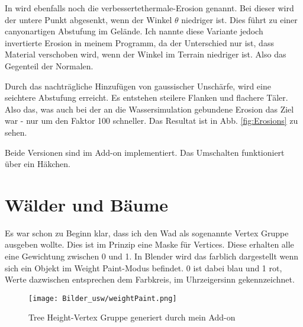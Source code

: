 \documentclass[12pt,twoside]{book}
\begin{document}
In \cite{erosion} wird ebenfalls noch die \glqq verbesserte\grqq{ }thermale-Erosion genannt. Bei dieser wird der untere Punkt abgesenkt, wenn der Winkel  \( \theta\) niedriger ist.
Dies f\"uhrt zu einer canyonartigen Abstufung im Gel\"ande. Ich nannte diese Variante jedoch invertierte Erosion in meinem Programm, da der Unterschied nur ist, dass Material verschoben wird, wenn der Winkel im Terrain niedriger ist. Also das Gegenteil der Normalen.

Durch das nachtr\"agliche Hinzuf\"ugen von gaussischer Unsch\"arfe, wird eine seichtere Abstufung erreicht. Es entstehen steilere Flanken und flachere T\"aler.  Also das, was auch bei der an die Wassersimulation gebundene Erosion das Ziel war - nur um den Faktor 100 schneller.
Das Resultat ist in Abb. \ref{fig:Erosions} zu sehen.

Beide Versionen sind im Add-on implementiert. Das Umschalten funktioniert \"uber ein H\"akchen. 


\section {W\"alder und B\"aume}

Es war schon zu Beginn klar, dass ich den Wad als sogenannte Vertex Gruppe ausgeben wollte. Dies ist im Prinzip eine Maske f\"ur Vertices. Diese erhalten alle eine Gewichtung zwischen 0 und 1. In Blender wird das farblich dargestellt wenn sich ein Objekt im \glqq Weight Paint\grqq-Modus befindet. 0 ist dabei blau und 1 rot, Werte dazwischen entsprechen dem Farbkreis, im Uhrzeigersinn gekennzeichnet.

\begin{figure}[H]
\texttt{[image: Bilder\_usw/weightPaint.png]}
 \centering
 \caption{ \glqq Tree Height\grqq-Vertex Gruppe generiert durch mein Add-on}
  \centering
  \label{fig:TreeHeight}
\end{figure}
\end{document}
